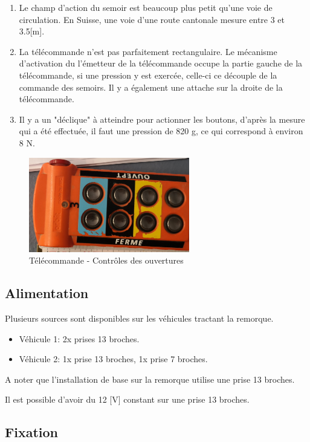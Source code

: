 \begin{enumerate}
    \item{Le champ d'action du semoir est beaucoup plus petit qu'une voie de circulation. En Suisse, une voie d'une route cantonale mesure entre 3 et 3.5[m].}
    \item{La télécommande n'est pas parfaitement rectangulaire. Le mécanisme d'activation du l'émetteur de la télécommande occupe la partie gauche de la télécommande,
                si une pression y est exercée, celle-ci ce découple de la commande des semoirs. Il y a également une attache sur la droite de la télécommande.}
    \item{Il y a un "déclique" à atteindre pour actionner les boutons, d'après la mesure qui a été effectuée, il faut une pression de 820 \si{\gram}, ce qui correspond à environ 8 \si{\newton}}.
\end{enumerate}

\begin{figure}[H]
    \centering
    \includegraphics[width=7cm]{assets/figures/telecommande2.jpg}
    \caption{Télécommande - Contrôles des ouvertures}
\end{figure}

\subsection{Alimentation}
Plusieurs sources sont disponibles sur les véhicules tractant la remorque.
\begin{itemize}
    \item{Véhicule 1: 2x prises 13 broches.}
    \item{Véhicule 2: 1x prise 13 broches, 1x prise 7 broches.}
\end{itemize}
A noter que l'installation de base sur la remorque utilise une prise 13 broches.

Il est possible d'avoir du 12 [V] constant sur une prise 13 broches.

\subsection{Fixation}
